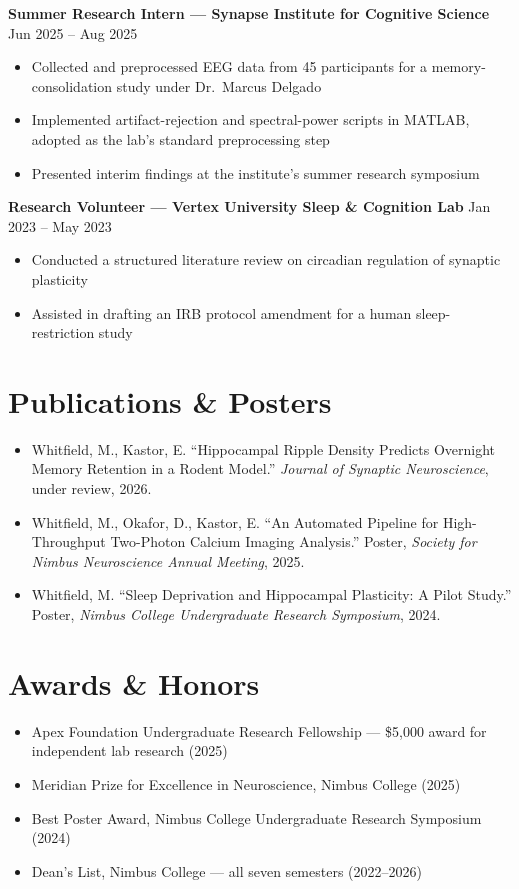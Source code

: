 \documentclass[10pt,a4paper]{article}
\newcommand{\entryhead}[3]{%
  \textbf{#1} \hfill {\color{softgray}\small #2}\\[0.05em]
  {\itshape\color{accentmaroon} #3}\par
}
\begin{document}
\entryhead{Summer Research Intern --- Synapse Institute for Cognitive Science}{Jun 2025 -- Aug 2025}{}
\begin{itemize}
  \item Collected and preprocessed EEG data from 45 participants for a memory-consolidation study under Dr.\ Marcus Delgado
  \item Implemented artifact-rejection and spectral-power scripts in MATLAB, adopted as the lab's standard preprocessing step
  \item Presented interim findings at the institute's summer research symposium
\end{itemize}

\entryhead{Research Volunteer --- Vertex University Sleep \& Cognition Lab}{Jan 2023 -- May 2023}{}
\begin{itemize}
  \item Conducted a structured literature review on circadian regulation of synaptic plasticity
  \item Assisted in drafting an IRB protocol amendment for a human sleep-restriction study
\end{itemize}

\section*{Publications \& Posters}
\begin{itemize}
  \item Whitfield, M., Kastor, E. ``Hippocampal Ripple Density Predicts Overnight Memory Retention in a Rodent Model.'' \textit{Journal of Synaptic Neuroscience}, under review, 2026.
  \item Whitfield, M., Okafor, D., Kastor, E. ``An Automated Pipeline for High-Throughput Two-Photon Calcium Imaging Analysis.'' Poster, \textit{Society for Nimbus Neuroscience Annual Meeting}, 2025.
  \item Whitfield, M. ``Sleep Deprivation and Hippocampal Plasticity: A Pilot Study.'' Poster, \textit{Nimbus College Undergraduate Research Symposium}, 2024.
\end{itemize}

\section*{Awards \& Honors}
\begin{itemize}
  \item Apex Foundation Undergraduate Research Fellowship --- \$5,000 award for independent lab research (2025)
  \item Meridian Prize for Excellence in Neuroscience, Nimbus College (2025)
  \item Best Poster Award, Nimbus College Undergraduate Research Symposium (2024)
  \item Dean's List, Nimbus College --- all seven semesters (2022--2026)
\end{itemize}
\end{document}
